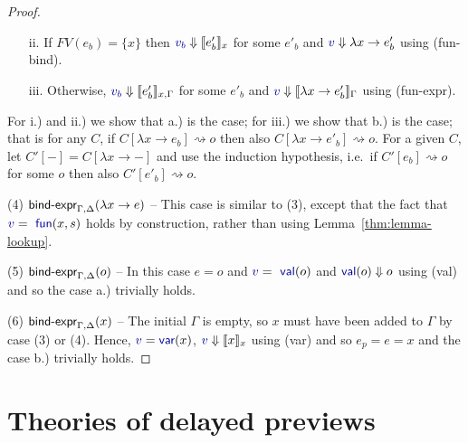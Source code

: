 \documentclass[english,submission]{programming}
\theoremstyle{plain}
\theoremstyle{definition}
\newcommand{\ident}[1]{\textnormal{\textcolor{idclr}{\sffamily #1}}}
\newcommand{\bndclr}[1]{\textcolor{kvdclr}{#1}}
\newcommand{\bnd}[1]{\textnormal{\textcolor{kvdclr}{\sffamily #1}}}
\newcommand{\rname}[1]{{\sffamily(#1)}}
\begin{document}
\begin{proof}
\begin{enumerate}
  \item[ii.]
  If $FV(e_b)=\{x\}$ then $\bndclr{v_b}\Downarrow \llbracket e'_b \rrbracket_x$ for some $e'_b$ and
  $\bndclr{v}\Downarrow \lambda x\rightarrow e'_b$ using \rname{fun-bind}.

  \item[iii.]
  Otherwise, $\bndclr{v_b}\Downarrow \llbracket e'_b \rrbracket_{x,\Gamma}$ for some $e'_b$ and
  $\bndclr{v}\Downarrow \llbracket\lambda x\rightarrow e'_b\rrbracket_\Gamma$ using \rname{fun-expr}.
  \end{enumerate}

\noindent
For i.) and ii.) we show that a.) is the case; for iii.) we show that b.) is the case; that is
for any $C$, if $C[\lambda x\rightarrow e_b] \rightsquigarrow o$ then also
$C[\lambda x\rightarrow e'_b] \rightsquigarrow o$. For a given $C$, let $C'[-] = C[\lambda x\rightarrow -]$
and use the induction hypothesis, i.e.~if $C'[e_b] \rightsquigarrow o$ for some $o$ then also $C'[e'_b] \rightsquigarrow o$.

\vspace{0.75em}\noindent(4) $\ident{bind-expr}_{\Gamma, \Delta}(\lambda x\rightarrow e)$  --
  This case is similar to (3), except that the fact that $\bndclr{v} = \bnd{fun}(x, s)$
  holds by construction, rather than using Lemma~\ref{thm:lemma-lookup}.

\vspace{0.75em}\noindent(5) $\ident{bind-expr}_{\Gamma, \Delta}(o)$ -- In this case $e=o$ and $\bndclr{v} = \bnd{val}(o)$
  and $\bnd{val}(o)\Downarrow o$ using \rname{val} and so the case a.) trivially holds.

\vspace{0.75em}\noindent(6) $\ident{bind-expr}_{\Gamma, \Delta}(x)$ -- The initial $\Gamma$ is empty,
  so $x$ must have been added to $\Gamma$ by case (3) or (4). Hence,
  $\bndclr{v}=\bnd{var}(x)$, $\bndclr{v}\Downarrow \llbracket x \rrbracket_{x}$ using \rname{var}
  and so $e_p = e = x$ and the case b.) trivially holds.

\end{proof}


\section{Theories of delayed previews}
\label{sec:app-theories}
\end{document}
